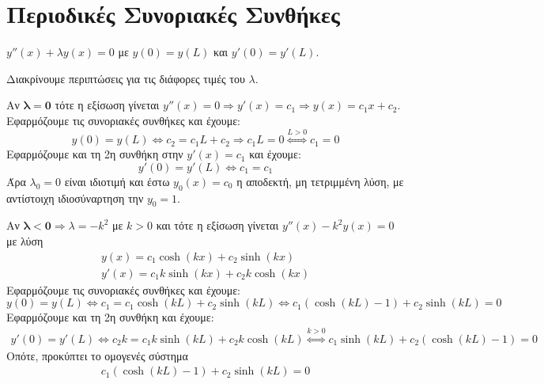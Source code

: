 \section*{Περιοδικές Συνοριακές Συνθήκες}


\begin{mybox3}
\begin{example}
  $ y''(x) + \lambda y(x)=0 $ με $ y(0)=y(L) $ και $ y'(0)=y'(L) $.
\end{example}
\end{mybox3}
\begin{solution}
  Διακρίνουμε περιπτώσεις για τις διάφορες τιμές του $ \lambda $.
  \begin{myitemize}
    \item Αν $ \bm{\lambda = 0} $ τότε η εξίσωση γίνεται 
      $ y''(x)=0 \Rightarrow y'(x) = c_{1} \Rightarrow y(x) = c_{1}x + c_{2} $. 
      Εφαρμόζουμε τις συνοριακές συνθήκες και έχουμε:
      \[
        y(0)=y(L) \Leftrightarrow c_{2}= c_{1}L + c_{2} \Rightarrow c_{1}L=0
        \overset{L>0}{\Leftrightarrow} c_{1} = 0
      \] 
      Εφαρμόζουμε και τη 2η συνθήκη στην $ y'(x)= c_{1} $ και έχουμε:
      \[
        y'(0)=y'(L) \Leftrightarrow c_{1} = c_{1}
      \]
      Άρα $ \lambda_{0}=0 $ είναι ιδιοτιμή και έστω $ y_{0}(x)=c_{0} $ η αποδεκτή, 
      μη τετριμμένη λύση, με αντίστοιχη ιδιοσύναρτηση την $y_{0}=1 $. 
    \item Αν $ \bm{\lambda < 0} \Rightarrow \lambda = -k^{2} $ με $ k>0 $ και τότε η 
      εξίσωση γίνεται $ y''(x) -k^{2}y(x)=0$ με λύση 
      \begin{align*} 
        y(x) = c_{1} \cosh{(kx)} + c_{2} \sinh{(kx)} \\
        y'(x) = c_{1}k \sinh{(kx)} + c_{2}k \cosh{(kx)} 
      \end{align*}
      Εφαρμόζουμε τις συνοριακές συνθήκες και έχουμε:
      \[
        y(0)=y(L) \Leftrightarrow  c_{1} = c_{1} \cosh{(kL)} + c_{2} \sinh{(kL)} 
        \Leftrightarrow c_{1}(\cosh{(kL)} -1) + c_{2} \sinh{(kL)} = 0
      \] 
      Εφαρμόζουμε και τη 2η συνθήκη και έχουμε:
      \begin{gather*}
        y'(0)=y'(L) \Leftrightarrow c_{2}k = c_{1}k \sinh{(kL)} + c_{2}k \cosh{(kL)} 
        \overset{k > 0}{\Leftrightarrow} 
         c_{1} \sinh{(kL)} + c_{2} (\cosh{(kL)} -1) = 0
      \end{gather*}
      Οπότε, προκύπτει το ομογενές σύστημα 
      \[
        \left.
          \begin{matrix}
            c_{1}(\cosh{(kL)} -1) + c_{2} \sinh{(kL)} = 0 \\

\end{matrix}\]
\end{myitemize}
\end{solution}
